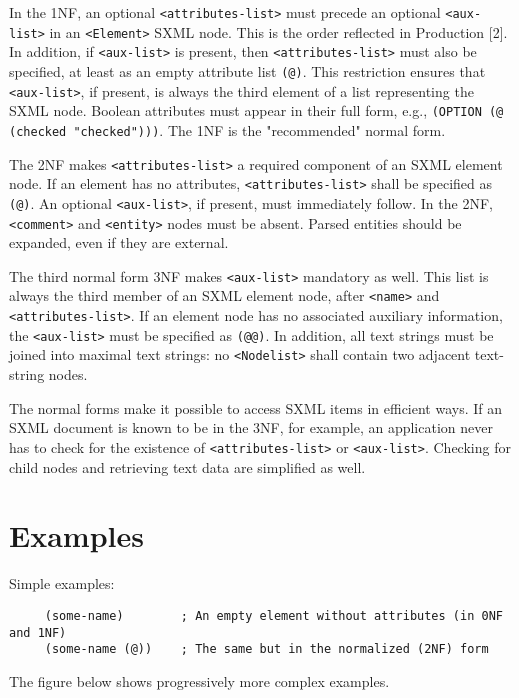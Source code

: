 \documentclass[10pt]{article}
\begin{document}
In the 1NF, an optional \texttt{<attributes-list>} must
precede an optional \texttt{<aux-list>} in an \texttt{<Element>} SXML node. This is the order
reflected in Production [2].  In addition, if \texttt{<aux-list>} is present, then
\texttt{<attributes-list>} must also be specified, at least as
an empty attribute list \texttt{(@)}. This restriction ensures
that \texttt{<aux-list>}, if present, is always the third
element of a list representing the SXML node. Boolean attributes must
appear in their full form, e.g., \texttt{(OPTION (@ (checked "checked")))}. The 1NF is the "recommended" normal form.

The 2NF makes \texttt{<attributes-list>} a required component of an SXML element node. If an element has no attributes, \texttt{<attributes-list>} shall be specified as \texttt{(@)}. An optional \texttt{<aux-list>}, if present, must immediately follow. In the 2NF,
\texttt{<comment>} and \texttt{<entity>} nodes
must be absent. Parsed entities should be expanded, even
if they are external.

The third normal form 3NF makes \texttt{<aux-list>}
mandatory as well. This list is always the third member of an SXML
element node, after \texttt{<name>} and \texttt{<attributes-list>}. If an element node has
no associated auxiliary information, the \texttt{<aux-list>} must
be specified as \texttt{(@@)}. In addition, all text strings must be
joined into maximal text strings: no \texttt{<Nodelist>} shall
contain two adjacent text-string nodes.

The normal forms make it possible to access SXML items in
efficient ways. If an SXML document is known to be in the 3NF, for
example, an application never has to check for the existence of
 \texttt{<attributes-list>} or \texttt{<aux-list>}. Checking for child nodes and retrieving text data are simplified as well.

\section{Examples}
Simple examples:\begin{verbatim}
     (some-name)        ; An empty element without attributes (in 0NF and 1NF)
     (some-name (@))    ; The same but in the normalized (2NF) form
\end{verbatim}


The figure below shows progressively more complex examples.
\end{document}
